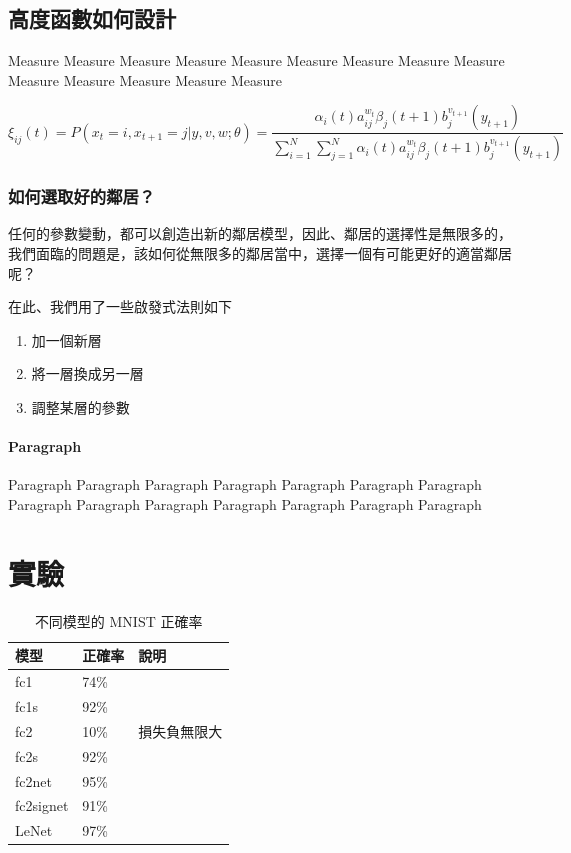\documentclass{article}
\begin{document}
\subsection{高度函數如何設計}

Measure Measure Measure Measure Measure Measure Measure Measure Measure Measure Measure Measure Measure Measure 

\begin{equation}
\xi _{ij}(t)=P(x_{t}=i,x_{t+1}=j|y,v,w;\theta)= {\frac {\alpha _{i}(t)a^{w_t}_{ij}\beta _{j}(t+1)b^{v_{t+1}}_{j}(y_{t+1})}{\sum _{i=1}^{N} \sum _{j=1}^{N} \alpha _{i}(t)a^{w_t}_{ij}\beta _{j}(t+1)b^{v_{t+1}}_{j}(y_{t+1})}}
\end{equation}

\subsubsection{如何選取好的鄰居？}

任何的參數變動，都可以創造出新的鄰居模型，因此、鄰居的選擇性是無限多的，我們面臨的問題是，該如何從無限多的鄰居當中，選擇一個有可能更好的適當鄰居呢？

在此、我們用了一些啟發式法則如下

\begin{enumerate}  
\item 加一個新層 
\item 將一層換成另一層
\item 調整某層的參數
\end{enumerate}

\paragraph{Paragraph}

Paragraph Paragraph Paragraph Paragraph Paragraph Paragraph Paragraph Paragraph Paragraph Paragraph Paragraph Paragraph Paragraph Paragraph 

\section{實驗}
\label{sec:others}

\begin{table}
 \caption{不同模型的 MNIST 正確率}
  \centering
  \begin{tabular}{lll}
    模型     & 正確率     & 說明 \\
    \midrule
    fc1 & 74\% &       \\
    fc1s & 92\% &       \\
    fc2 & 10\% & 損失負無限大 \\
    fc2s & 92\% &       \\
    fc2net & 95\% &       \\
    fc2signet & 91\% &       \\
    LeNet & 97\%  &      \\
    \bottomrule
  \end{tabular}
  \label{tab:table}
\end{table}
\end{document}

